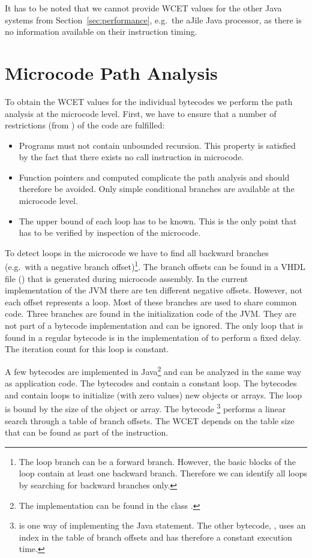 It has to be noted that we cannot provide WCET values for the other
Java systems from Section~\ref{sec:performance}, e.g.\ the aJile Java
processor, as there is no information available on their instruction
timing.


\section{Microcode Path Analysis}

To obtain the WCET values for the individual bytecodes we perform
the path analysis at the microcode level. First, we have to ensure
that a number of restrictions (from \cite{pusch:maxt:jnl}) of the
code are fulfilled:
%
\begin{itemize}
    \item Programs must not contain unbounded recursion. This property
    is satisfied by the fact that there exists no call instruction in
    microcode.
    \item Function pointers and computed  complicate the
    path analysis and should therefore be avoided. Only simple conditional
    branches are available at the microcode level.
    \item The upper bound of each loop has to be known. This is the only
    point that has to be verified by inspection of the microcode.
\end{itemize}
%
To detect loops in the microcode we have to find all backward
branches (e.g.\ with a negative branch offset)\footnote{The loop
branch can be a forward branch. However, the basic blocks of the
loop contain at least one backward branch. Therefore we can identify
all loops by searching for backward branches only.}. The branch
offsets can be found in a VHDL file () that is
generated during microcode assembly. In the current implementation
of the JVM there are ten different negative offsets. However, not
each offset represents a loop. Most of these branches are used to
share common code. Three branches are found in the initialization
code of the JVM. They are not part of a bytecode implementation and
can be ignored. The only loop that is found in a regular bytecode is
in the implementation of  to perform a fixed delay. The
iteration count for this loop is constant.

A few bytecodes are implemented in Java\footnote{The implementation
can be found in the class .} and can be
analyzed in the same way as application code. The bytecodes
 and  contain a constant loop. The bytecodes
 and  contain loops to initialize (with
zero values) new objects or arrays. The loop is bound by the size of
the object or array. The bytecode
\footnote{ is one way of
implementing the Java  statement. The other
bytecode, , uses an index in the table of
branch offsets and has therefore a constant execution time.}
performs a linear search through a table of branch offsets. The WCET
depends on the table size that can be found as part of the
instruction.

